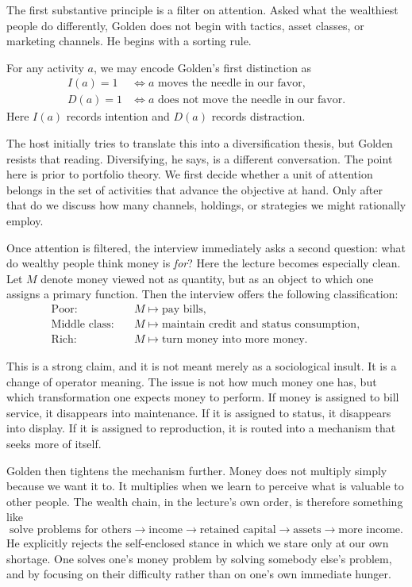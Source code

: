 The first substantive principle is a filter on attention. Asked what the wealthiest people do differently, Golden does not begin with tactics, asset classes, or marketing channels. He begins with a sorting rule.

\begin{definition}
For any activity \(a\), we may encode Golden's first distinction as
\begin{align}
I(a)=1 &\iff a \text{ moves the needle in our favor},\\
D(a)=1 &\iff a \text{ does not move the needle in our favor}.
\end{align}
Here \(I(a)\) records intention and \(D(a)\) records distraction.
\end{definition}

The host initially tries to translate this into a diversification thesis, but Golden resists that reading. Diversifying, he says, is a different conversation. The point here is prior to portfolio theory. We first decide whether a unit of attention belongs in the set of activities that advance the objective at hand. Only after that do we discuss how many channels, holdings, or strategies we might rationally employ.

Once attention is filtered, the interview immediately asks a second question: what do wealthy people think money is \emph{for}? Here the lecture becomes especially clean. Let \(M\) denote money viewed not as quantity, but as an object to which one assigns a primary function. Then the interview offers the following classification:
\begin{align}
\text{Poor:}\quad & M \mapsto \text{pay bills},\\
\text{Middle class:}\quad & M \mapsto \text{maintain credit and status consumption},\\
\text{Rich:}\quad & M \mapsto \text{turn money into more money}.
\end{align}

This is a strong claim, and it is not meant merely as a sociological insult. It is a change of operator meaning. The issue is not how much money one has, but which transformation one expects money to perform. If money is assigned to bill service, it disappears into maintenance. If it is assigned to status, it disappears into display. If it is assigned to reproduction, it is routed into a mechanism that seeks more of itself.

Golden then tightens the mechanism further. Money does not multiply simply because we want it to. It multiplies when we learn to perceive what is valuable to other people. The wealth chain, in the lecture's own order, is therefore something like
\begin{equation}
\text{solve problems for others} \rightarrow \text{income} \rightarrow \text{retained capital} \rightarrow \text{assets} \rightarrow \text{more income}.
\end{equation}
He explicitly rejects the self-enclosed stance in which we stare only at our own shortage. One solves one's money problem by solving somebody else's problem, and by focusing on their difficulty rather than on one's own immediate hunger.

